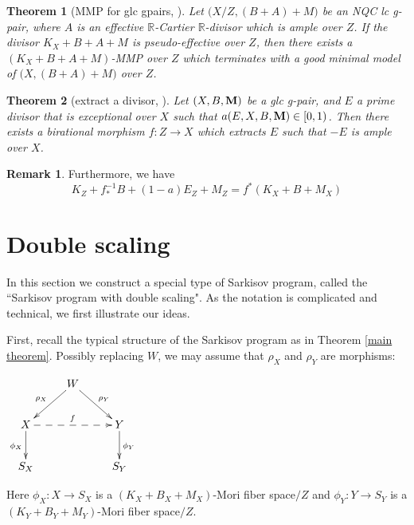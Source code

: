 \documentclass[11pt]{amsart}
\numberwithin{equation}{section}
\newcommand{\Mm}{{\bf{M}}}
\newtheorem{thm}{Theorem}[section]
\theoremstyle{definition}
\theoremstyle{definition}
\theoremstyle{definition}
\newtheorem{remark}[theorem]{Remark}
\begin{document}
\begin{thm}[MMP for glc gpairs, {\cite[Theorem 4.4]{TX23}}]\label{thm: gen pair mmp}
		Let $ \big( X/Z,(B+A)+M \big) $ be an NQC lc g-pair, where $ A $ is an effective $ \mathbb{R} $-Cartier $\mathbb{R}$-divisor which is ample over $ Z $. If the divisor $K_X+B+A+M$ is pseudo-effective over $Z$, then there exists a $(K_X+B+A+M)$-MMP over $Z$ which terminates with a good minimal model of $ \big( X,(B+A)+M \big) $ over $ Z $.
\end{thm}


\begin{thm}[extract a divisor, {\cite[Theorem 1.7]{LX22b}}]\label{lem: extracting divisor}
Let $(X,B,\Mm)$ be a glc g-pair, and $E$ a prime divisor that is exceptional over $X$ such that $a(E,X,B,\Mm)\in [0,1)$. Then there exists a birational morphism $f: Z\to X$ which extracts $E$ such that $-E$ is ample over $X$.
\end{thm}
\begin{remark}
  Furthermore, we have 
  \[
  K_{Z}+f^{-1}_{*}B+(1-a)E_{Z}+M_{Z}=f^*(K_{X}+B+M_{X}) 
\]
\end{remark}

\section{Double scaling}
In this section we construct a special type of Sarkisov program, called the ``Sarkisov program with double scaling". As the notation is complicated and technical, we first illustrate our ideas.

First, recall the typical structure of the Sarkisov program as in Theorem \ref{main theorem}. Possibly replacing $W$, we may assume that $\rho_X$ and $\rho_Y$ are morphisms:
\begin{center}$\xymatrix{
 & W\ar@{->}[dl]_{\rho_X}\ar@{->}[dr]^{\rho_Y}& \\
      X \ar@{->}[d]_{\phi_X}\ar@{-->}[rr]^{f}   &  & Y\ar@{->}[d]^{\phi_Y} \\
    S_X & &S_Y }$
\end{center}
Here $\phi_X: X\rightarrow S_X$ is a $(K_X+B_X+M_X)$-Mori fiber space$/Z$ and $\phi_Y: Y\rightarrow S_Y$ is a $(K_Y+B_Y+M_Y)$-Mori fiber space$/Z$. 
\end{document}
